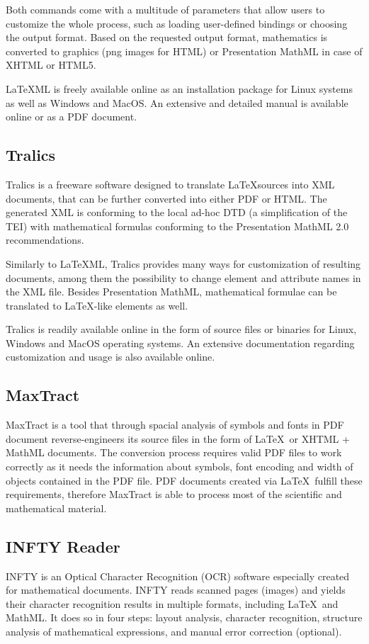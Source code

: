 \documentclass[11pt,oneside,final]{fithesis2}
\begin{document}
Both commands come with a multitude of parameters that allow users to customize the whole process, such as loading user-defined bindings or choosing the output format. Based on the requested output format, mathematics is converted to graphics (png images for HTML) or Presentation MathML in case of XHTML or HTML5. 

\LaTeX ML is freely available online as an installation package for Linux systems as well as Windows and MacOS. An extensive and detailed manual is available online or as a PDF document.

\subsection{Tralics}
Tralics \cite{tralics:grimm2003}\cite{dml:Grimm2010} is a freeware software designed to translate \LaTeX sources into XML documents, that can be further converted into either PDF or HTML. The generated XML is conforming to the local ad-hoc DTD (a simplification of the TEI) with mathematical formulas conforming to the Presentation MathML 2.0 recommendations.

Similarly to \LaTeX ML, Tralics provides many ways for customization of resulting documents, among them the possibility to change element and attribute names in the XML file. Besides Presentation MathML, mathematical formulae can be translated to \LaTeX -like   elements as well.

Tralics is readily available online in the form of source files or binaries for Linux, Windows and MacOS operating systems. An extensive documentation regarding customization and usage is also available online. 

\subsection{MaxTract}
MaxTract \cite{baker2012maxtract} is a tool that through spacial analysis of symbols and fonts in PDF document reverse-engineers its source files in the form of \LaTeX\ or XHTML + MathML documents. The conversion process requires valid PDF files to work correctly as it needs the information about symbols, font encoding and width of objects contained in the PDF file. PDF documents created via \LaTeX\ fulfill these requirements, therefore MaxTract is able to process most of the scientific and mathematical material.


\subsection{INFTY Reader}
INFTY \cite{suzuki2003infty} is an Optical Character Recognition (OCR) software especially created for mathematical documents. INFTY reads scanned pages (images) and yields their character recognition results in multiple formats, including \LaTeX\ and MathML. It does so in four steps: layout analysis, character recognition, structure analysis of mathematical expressions, and manual error correction (optional). 
\end{document}
